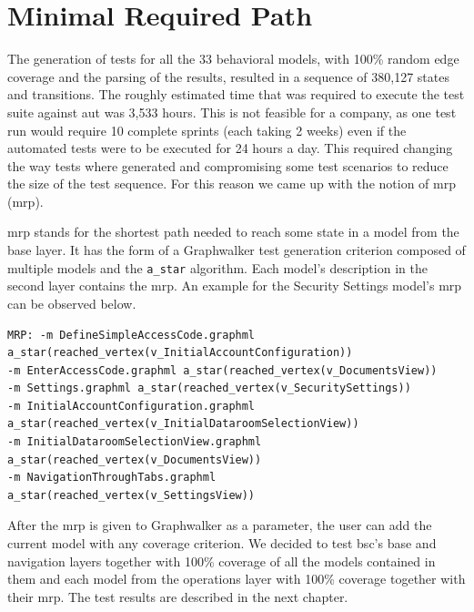 \section{Minimal Required Path}
\par
The generation of tests for all the 33 behavioral models, with 100\% random edge coverage and the parsing of the results, resulted in a sequence of 380,127 states and transitions. The roughly estimated time that was required to execute the test suite against \acrshort{aut} was 3,533 hours. This is not feasible for a company, as one test run would require 10 complete sprints (each taking 2 weeks) even if the automated tests were to be executed for 24 hours a day. This required changing the way tests where generated and compromising some test scenarios to reduce the size of the test sequence. For this reason we came up with the notion of \acrlong{mrp} (\acrshort{mrp}).

\par
\acrshort{mrp} stands for the shortest path needed to reach some state in a model from the base layer. It has the form of a Graphwalker test generation criterion composed of multiple models and the \texttt{a\_star} algorithm. Each model's description in the second layer contains the \acrshort{mrp}. An example for the Security Settings model's \acrshort{mrp} can be observed below.

\begin{lstlisting}
MRP: -m DefineSimpleAccessCode.graphml 
a_star(reached_vertex(v_InitialAccountConfiguration))
-m EnterAccessCode.graphml a_star(reached_vertex(v_DocumentsView))
-m Settings.graphml a_star(reached_vertex(v_SecuritySettings))
-m InitialAccountConfiguration.graphml 
a_star(reached_vertex(v_InitialDataroomSelectionView))
-m InitialDataroomSelectionView.graphml a_star(reached_vertex(v_DocumentsView)) 
-m NavigationThroughTabs.graphml a_star(reached_vertex(v_SettingsView))
\end{lstlisting}

After the \acrshort{mrp} is given to Graphwalker as a parameter, the user can add the current model with any coverage criterion. We decided to test \acrshort{bsc}'s base and navigation layers together with 100\% coverage of all the models contained in them and each model from the operations layer with 100\% coverage together with their \acrshort{mrp}. The test results are described in the next chapter.

